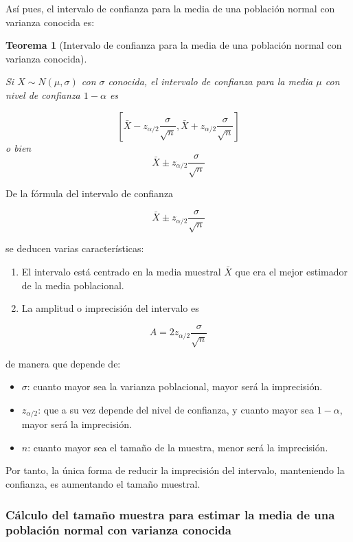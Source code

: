 \documentclass[
  spanish,
  a4paper,
]{scrreport}
\providecommand{\tightlist}{%
  \setlength{\itemsep}{0pt}\setlength{\parskip}{0pt}}
\theoremstyle{plain}
\newtheorem{theorem}{Teorema}[chapter]
\theoremstyle{definition}
\theoremstyle{definition}
\theoremstyle{remark}
\begin{document}
Así pues, el intervalo de confianza para la media de una población
normal con varianza conocida es:

\begin{theorem}[Intervalo de confianza para la media de una población
normal con varianza
conocida]\protect\hypertarget{thm-intervalo-confianza-media-normal-varianza-conocida}{}\label{thm-intervalo-confianza-media-normal-varianza-conocida}

Si \(X\sim N(\mu, \sigma)\) con \(\sigma\) conocida, el \emph{intervalo
de confianza para la media} \(\mu\) con nivel de confianza \(1-\alpha\)
es

\[
\left[\bar{X}-z_{\alpha/2}\frac{\sigma}{\sqrt{n}},\bar{X}+z_{\alpha/2}\frac{\sigma}{\sqrt{n}}\right]
\] o bien \[
\bar{X}\pm z_{\alpha/2}\frac{\sigma}{\sqrt{n}}
\]

\end{theorem}

De la fórmula del intervalo de confianza

\[
\bar{X}\pm z_{\alpha/2}\frac{\sigma}{\sqrt{n}}
\]

se deducen varias características:

\begin{enumerate}
\def\labelenumi{\alph{enumi}.}
\item
  El intervalo está centrado en la media muestral \(\bar X\) que era el
  mejor estimador de la media poblacional.
\item
  La amplitud o imprecisión del intervalo es
\end{enumerate}

\[
A= 2 z_{\alpha/2}\frac{\sigma}{\sqrt{n}}
\]

de manera que depende de:

\begin{itemize}
\tightlist
\item
  \(\sigma\): cuanto mayor sea la varianza poblacional, mayor será la
  imprecisión.
\item
  \(z_{\alpha/2}\): que a su vez depende del nivel de confianza, y
  cuanto mayor sea \(1-\alpha\), mayor será la imprecisión.
\item
  \(n\): cuanto mayor sea el tamaño de la muestra, menor será la
  imprecisión.
\end{itemize}

Por tanto, la única forma de reducir la imprecisión del intervalo,
manteniendo la confianza, es aumentando el tamaño muestral.

\subsubsection{Cálculo del tamaño muestra para estimar la media de una
población normal con varianza
conocida}\label{cuxe1lculo-del-tamauxf1o-muestra-para-estimar-la-media-de-una-poblaciuxf3n-normal-con-varianza-conocida}
\end{document}

